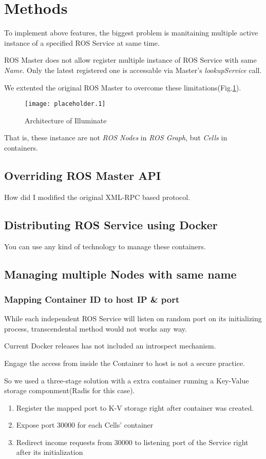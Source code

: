 \section{Methods}

To implement above features, the biggest problem is manitaining multiple active instance of a specified ROS Service at same time.

ROS Master does not allow register multiple instance of ROS Service with same \emph{Name}.
Only the latest registered one is accessable via Master's \emph{lookupService} call.

We extented the original ROS Master to overcome these limitations(Fig.\ref{figure:illuminate}). 

\begin{figure}[h]
\centering
\texttt{[image: placeholder.1]}
\caption{Architecture of Illuminate}
\label{figure:illuminate}
\end{figure}

That is, these instance are not \emph{ROS Nodes} in \emph{ROS Graph}, but \emph{Cells} in containers.

\subsection{Overriding ROS Master API}
How did I modified the original XML-RPC based protocol.

\subsection{Distributing ROS Service using Docker}
You can use any kind of technology to manage these containers.

\subsection{Managing multiple Nodes with same name}
\subsubsection{Mapping Container ID to host IP \& port}
While each independent ROS Service will listen on random port on its initializing process, transcendental method would not works any way. 

Current Docker releases has not included an introspect mechanism.

Engage the access from inside the Container to host is not a secure practice.

So we used a three-stage solution with a extra container running a Key-Value storage componment(Radis for this case).
\begin{enumerate}
    \item Register the mapped port to K-V storage right after container was created.
    \item Expose port 30000 for each Cells' container
    \item Redirect income requests from 30000 to listening port of the Service right after its initialization
\end{enumerate}

